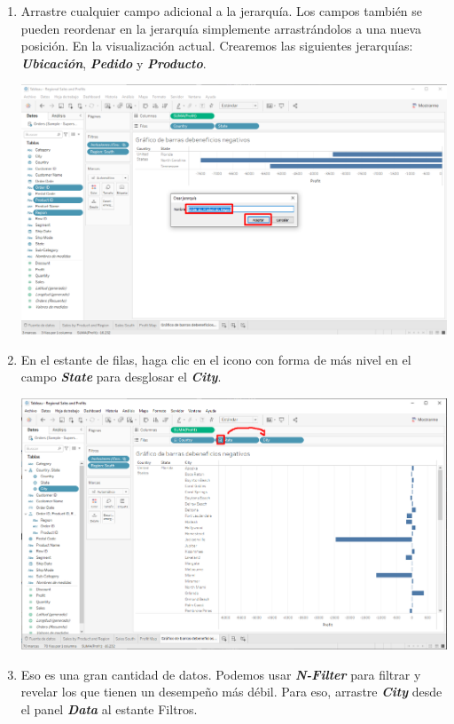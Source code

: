 \documentclass[12pt,letterpaper]{article}
\begin{document}
    \begin{enumerate}
        \item Arrastre cualquier campo adicional a la jerarquía. Los campos también se pueden reordenar en la jerarquía simplemente arrastrándolos a una nueva posición. En la visualización actual. Crearemos las siguientes jerarquías: \textit{\textbf{Ubicación}}, \textit{\textbf{Pedido}} y \textit{\textbf{Producto}}.
        \begin{center}
            \includegraphics[width=15cm]{./img/img46.png}
        \end{center}
        \item En el estante de filas, haga clic en el icono con forma de más nivel en el campo \textit{\textbf{State}} para desglosar el \textit{\textbf{City}}.      
        \begin{center}
            \includegraphics[width=15cm]{./img/img47.png}
        \end{center}
        \item Eso es una gran cantidad de datos. Podemos usar \textit{\textbf{N-Filter}} para filtrar y revelar los que tienen un desempeño más débil. Para eso, arrastre \textit{\textbf{City}} desde el panel \textit{\textbf{Data}} al estante Filtros.

\end{enumerate}
\end{document}
